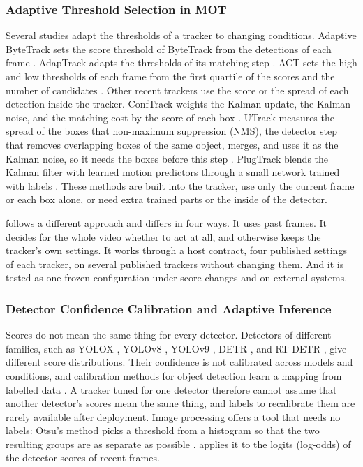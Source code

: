 \subsubsection{Adaptive Threshold Selection in MOT}
Several studies adapt the thresholds of a tracker to changing conditions. Adaptive ByteTrack sets
the score threshold of ByteTrack from the detections of each frame \cite{ma2023adaptivebytetrack}.
AdapTrack adapts the thresholds of its matching step \cite{shim2024adaptrack}. ACT sets the high and
low thresholds of each frame from the first quartile of the scores and the number of candidates
\cite{act2026adaptive}. Other recent trackers use the score or the spread of each detection inside
the tracker. ConfTrack weights the Kalman update, the Kalman noise, and the matching cost by the
score of each box \cite{jung2024conftrack}. UTrack measures the spread of the boxes that
non-maximum suppression (NMS), the detector step that removes overlapping boxes of the same object,
merges, and uses it as the Kalman noise, so it needs the boxes before this step
\cite{solano2025utrack}. PlugTrack blends the Kalman filter with learned motion predictors through a
small network trained with labels \cite{kim2026plugtrack}. These methods are built into the tracker,
use only the current frame or each box alone, or need extra trained parts or the inside of the
detector.

\scl{} follows a different approach and differs in four ways. It uses past frames. It decides for
the whole video whether to act at all, and otherwise keeps the tracker's own settings. It works
through a host contract, four published settings of each tracker, on several published trackers
without changing them. And it is tested as one frozen configuration under score changes and on
external systems.

\subsubsection{Detector Confidence Calibration and Adaptive Inference}
Scores do not mean the same thing for every detector. Detectors of different families, such as
YOLOX \cite{ge2021yolox}, YOLOv8 \cite{jocher2023yolov8}, YOLOv9 \cite{wang2024yolov9}, DETR
\cite{carion2020detr}, and RT-DETR \cite{zhao2024rtdetr}, give different score distributions. Their
confidence is not calibrated across models and conditions, and calibration methods for object
detection learn a mapping from labelled data \cite{kuppers2020detcalib}. A tracker tuned for one
detector therefore cannot assume that another detector's scores mean the same thing, and labels to
recalibrate them are rarely available after deployment. Image processing offers a tool that needs
no labels: Otsu's method picks a threshold from a histogram so that the two resulting groups are as
separate as possible \cite{otsu1979}. \scl{} applies it to the logits (log-odds) of the detector
scores of recent frames.

